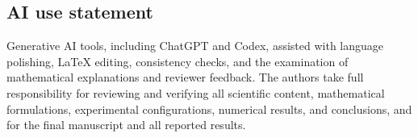 \documentclass{article}
\begin{document}
\subsection*{AI use statement}
Generative AI tools, including ChatGPT and Codex, assisted with language polishing, LaTeX editing, consistency checks, and the examination of mathematical explanations and reviewer feedback. The authors take full responsibility for reviewing and verifying all scientific
content, mathematical formulations, experimental configurations, numerical
results, and conclusions, and for the final manuscript and all reported results.




\appendix




\FloatBarrier

\FloatBarrier

\FloatBarrier

\clearpage

\clearpage

\end{document}
